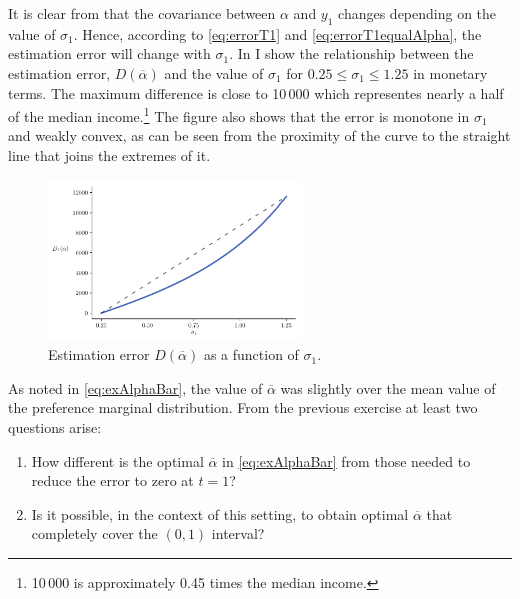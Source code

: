 \documentclass[english, a4paper,12pt]{article}
\begin{document}
It is clear from  that the covariance between $\alpha$ and $y_{1}$ changes depending on the value of $\sigma_{1}$. Hence, according to \eqref{eq:errorT1} and \eqref{eq:errorT1equalAlpha}, the estimation error will change with $\sigma_{1}$. In  I show the relationship between the estimation error, $D(\overline{\alpha})$ and the value of $\sigma_{1}$ for $0.25 \leq \sigma_{1} \leq 1.25$ in monetary terms. The maximum difference is close to 10\,000 which representes nearly a half of the median income.\footnote{10\,000 is approximately 0.45 times the median income.} The figure also shows that the error is monotone in $\sigma_{1}$ and weakly convex, as can be seen from the proximity of the curve to the straight line that joins the extremes of it.
	\begin{figure}[H] 
		\caption{Estimation error $D(\overline{\alpha})$ as a function of $\sigma_{1}$.}
		\label{fig:RADiffPlot}
		\includegraphics[width = 0.6\textwidth]{RAdiffPlot}
	\end{figure}
As noted in \eqref{eq:exAlphaBar}, the value of $\overline{\alpha}$ was slightly over the mean value of the preference marginal distribution. From the previous exercise at least two questions arise:
	\begin{enumerate}
		\item How different is the optimal $\overline{\alpha}$ in \eqref{eq:exAlphaBar} from those needed to reduce the error to zero at $t = 1$?
		\item Is it possible, in the context of this setting, to obtain optimal $\overline{\alpha}$ that completely cover the $(0,1)$ interval?  
	\end{enumerate}
\end{document}
